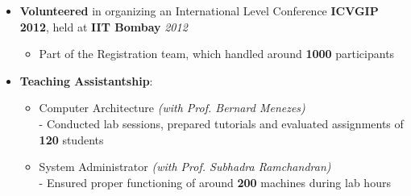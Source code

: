 \begin{itemize}
	\item \textbf{Volunteered} in organizing an International Level Conference \textbf{ICVGIP 2012}, held at \textbf{IIT Bombay} \hfill \emph{2012} \\[-0.6cm]
	\begin{itemize}
		\item Part of the Registration team, which handled around \textbf{1000} participants \\[-0.6cm]
	\end{itemize}
	\item \textbf{Teaching Assistantship}: \hfill \\[-0.6cm]
	\begin{itemize}
		\item Computer Architecture \hfill \emph{(with Prof. Bernard Menezes)} \\[0.05cm]
- Conducted lab sessions, prepared tutorials and evaluated assignments of \textbf{120} students \\[-0.5cm]
		\item System Administrator \hfill \emph{(with Prof. Subhadra Ramchandran)} \\[0.05cm]
- Ensured proper functioning of around \textbf{200} machines during lab hours \\[-0.4cm]
	\end{itemize}
\end{itemize}
